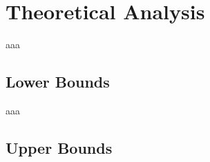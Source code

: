 \section{Theoretical Analysis}
\label{sec:theoretical}
aaa

\subsection{Lower Bounds}
\label{sub:lower_bounds}
aaa

\subsection{Upper Bounds}
\label{sub:upper_bounds}

